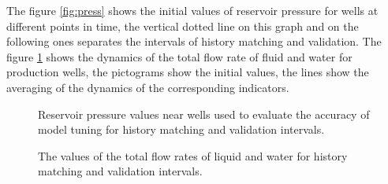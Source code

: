 \documentclass[
11pt,%
tightenlines,%
twoside,%
onecolumn,%
nofloats,%
nobibnotes,%
nofootinbib,%
superscriptaddress,%
noshowpacs,%
centertags]%
{revtex4}
\begin{document}
The figure \ref{fig:press} shows the initial values of reservoir pressure for wells at different points in time, the vertical dotted line on this graph and on the following ones separates the intervals of history matching and validation. The figure \ref{fig:qlic} shows the dynamics of the total flow rate of fluid and water for production wells, the pictograms show the initial values, the lines show the averaging of the dynamics of the corresponding indicators.
\begin{figure} 
    \begin{minipage}[h]{0.48\linewidth}
      \caption{Reservoir pressure values near wells used to evaluate the accuracy of model tuning for history matching and validation intervals.}
      \label{fig:press}
    \end{minipage} \hfill
    \begin{minipage}[h]{0.48\linewidth}
      \caption{The values of the total flow rates of liquid and water for history matching and validation intervals.}
      \label{fig:qlic}
    \end{minipage} 
\end{figure}
\end{document}

